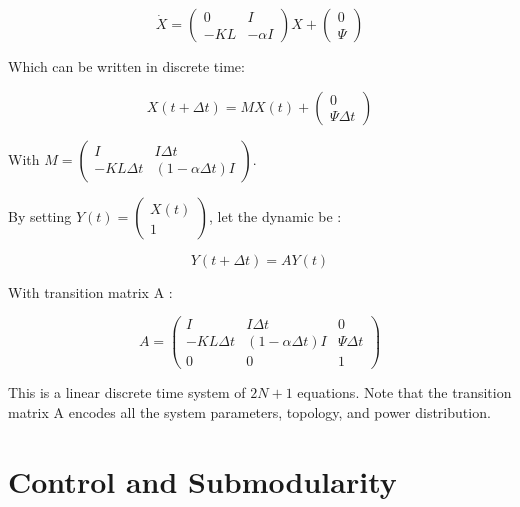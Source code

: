 \documentclass[conference]{IEEEtran}
\begin{document}
\begin{equation}
 \dot{X} = \left( \begin{array}{cc} 0 & I \\ - KL & -\alpha I \end{array} \right) X + \left( \begin{array}{c} 0 \\ \Psi \end{array} \right)
\end{equation}
 
Which can be written in discrete time: 

\begin{equation} 
X(t+\Delta t) = M  X(t) +  \left( \begin{array}{c} 0 \\ \Psi \Delta t \end{array} \right)
\end{equation} 

With $ M = \left( \begin{array}{cc} I & I \Delta t \\ -KL \Delta t & (1-\alpha \Delta t) I \end{array} \right) $.

By setting $ Y(t) =  \left( \begin{array}{c} X(t) \\ 1 \end{array} \right) $, let the dynamic be :

\begin{equation}
 Y(t+\Delta t) = A Y(t)
\end{equation}

With transition matrix A :

\begin{equation}
 A =   \left( \begin{array}{ccc} I & I \Delta t & 0 \\ -KL \Delta t & (1-\alpha \Delta t)I & \Psi \Delta t \\ 0&0&1 \end{array} \right)
\end{equation}

This is a linear discrete time system of $ 2 N + 1 $ equations. Note that the transition matrix A encodes all the system parameters, topology, and power distribution.



\section{Control and Submodularity}
\label{sec:control_and_submodularity}
\end{document}
